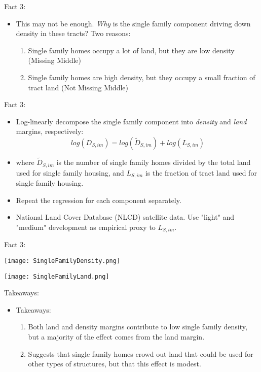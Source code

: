 \documentclass{beamer}
\theoremstyle{plain}
\begin{document}
\begin{frame}{Fact 3:}
\begin{itemize}
	\color{black}
	\item This may not be enough. \textit{Why} is the single family component driving down density in these tracts? Two reasons:
	\begin{enumerate}
		\itemsep1em
		\item  Single family homes occupy a lot of land, but they are low density (Missing Middle)
		\item Single family homes are high density, but they occupy a small fraction of tract land (Not Missing Middle)
	\end{enumerate}
\end{itemize}	
\end{frame}

\begin{frame}{Fact 3:}
\begin{itemize}
\color{black}
\item Log-linearly decompose the single family component into \textit{density} and \textit{land} margins, respectively: 
\begin{equation}
	log(D_{S, im}) = log(\tilde{D}_{S, im}) + log(L_{S, im})
\end{equation}
\item where $\tilde{D}_{S, im}$ is the number of single family homes divided by the total land used for single family housing, and $L_{S, im}$ is the fraction of tract land used for single family housing. 
\item \color{red} Repeat the regression for each component separately. \color{black}
\item National Land Cover Database (NLCD) satellite data. Use "light" and "medium" development as empirical proxy to $L_{S, im}$. 
\end{itemize}
\end{frame}

\begin{frame}{Fact 3:}
	\centerline{	\texttt{[image: SingleFamilyDensity.png]}}
\centerline{	
	\texttt{[image: SingleFamilyLand.png]}}
\end{frame}

\begin{frame}{Takeaways:}
\begin{itemize}
	\color{black}
	\item Takeaways:
	\begin{enumerate}
		\item Both land and density margins contribute to low single family density, but a majority of the effect comes from the land margin. 
		\item Suggests that single family homes crowd out land that could be used for other types of structures, but that this effect is modest. 
	\end{enumerate}
\end{itemize}
\end{frame}
\end{document}
